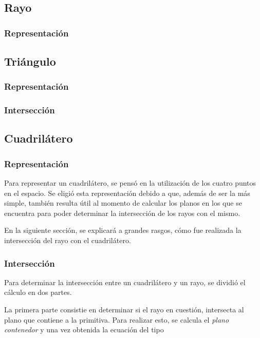 \documentclass[a4paper,10pt]{article}
\begin{document}
\subsection{Rayo}

\subsubsection{Representaci\'on}

\subsection{Tri\'angulo}
\label{triangulo}
\subsubsection{Representaci\'on}

\subsubsection{Intersecci\'on}

\subsection{Cuadril\'atero}

\subsubsection{Representaci\'on}
Para representar un cuadril\'atero, se pens\'o en la utilizaci\'on de los cuatro puntos en el espacio.  Se eligi\'o esta representaci\'on debido a que, adem\'as de ser la m\'as simple, tambi\'en resulta \'util al momento de calcular los planos en los que se encuentra para poder determinar la intersecci\'on de los rayos con el mismo.

En la siguiente secci\'on, se explicar\'a a grandes rasgos, c\'omo fue realizada la intersecci\'on del rayo con el cuadril\'atero.
\subsubsection{Intersecci\'on}
Para determinar la intersecci\'on entre un cuadril\'atero y un rayo, se dividi\'o el c\'alculo en dos partes.

La primera parte consistie en determinar si el rayo en cuesti\'on, intersecta al plano que contiene a la primitiva.  Para realizar esto, se calcula el \emph{plano contenedor} y una vez obtenida la ecuaci\'on del tipo
\end{document}
